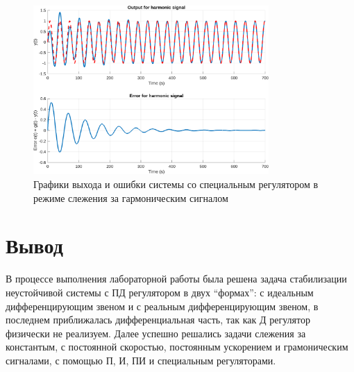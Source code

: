\begin{figure}[H]
    \centering
    \includegraphics[width=0.8\textwidth]{figs/task_6_out_harmonic.png}
    \caption{Графики выхода и ошибки системы со специальным регулятором в режиме слежения за гармоническим сигналом}
    \label{fig:task_6_out}
\end{figure}



\section{Вывод}

В процессе выполнения лабораторной работы была решена задача стабилизации
неустойчивой системы с ПД регулятором в двух ``формах'': с идеальным дифференцирующим звеном
и с реальным дифференцирующим звеном, в последнем приближалась дифференциальная часть,
так как Д регулятор физически не реализуем. Далее успешно решались задачи слежения 
за константым, с постоянной скоростью, постоянным ускорением и грамоническим сигналами,
с помощью П, И, ПИ и специальным регуляторами. 



